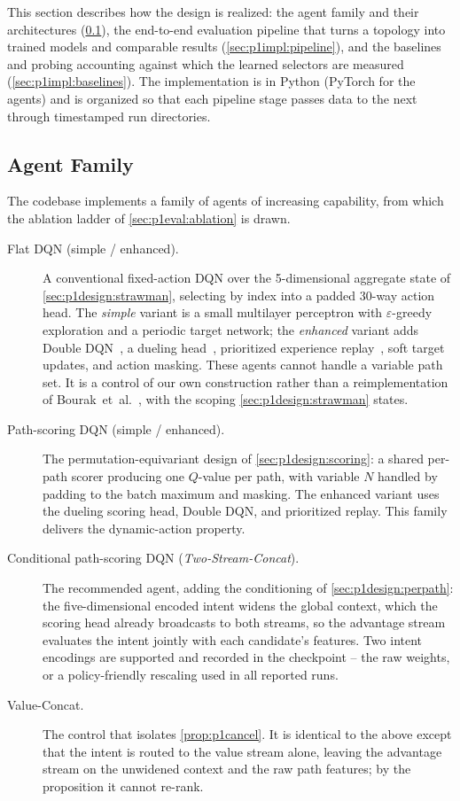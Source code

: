 This section describes how the design is realized: the agent family and their architectures
(\cref{sec:p1impl:agents}), the end-to-end evaluation pipeline that turns a topology into trained models
and comparable results (\cref{sec:p1impl:pipeline}), and the baselines and probing accounting against
which the learned selectors are measured (\cref{sec:p1impl:baselines}). The implementation is in Python
(PyTorch for the agents) and is organized so that each pipeline stage passes data to the next through
timestamped run directories.

\subsection{Agent Family}
\label{sec:p1impl:agents}

The codebase implements a family of agents of increasing capability, from which the ablation ladder of
\cref{sec:p1eval:ablation} is drawn.

\begin{description}
  \item[Flat DQN (simple / enhanced).] A conventional fixed-action DQN over the 5-dimensional aggregate
  state of \cref{sec:p1design:strawman}, selecting by index into a padded 30-way action head. The
  \emph{simple} variant is a small multilayer perceptron with $\varepsilon$-greedy
  exploration and a periodic target network; the \emph{enhanced} variant adds Double
  DQN~\cite{VanHasselt2016}, a dueling head~\cite{Wang2016}, prioritized experience
  replay~\cite{Schaul2016}, soft target updates, and action masking. These agents cannot handle a
  variable path set. It is a control of our own construction rather than a reimplementation of
  Bourak~et~al.~\cite{Bourak2025}, with the scoping \cref{sec:p1design:strawman} states.
  \item[Path-scoring DQN (simple / enhanced).] The permutation-equivariant design of
  \cref{sec:p1design:scoring}: a shared per-path scorer producing one $Q$-value per path, with variable
  $N$ handled by padding to the batch maximum and masking. The enhanced variant uses the dueling scoring
  head, Double DQN, and prioritized replay. This family delivers the dynamic-action property.
  \item[Conditional path-scoring DQN (\emph{Two-Stream-Concat}).] The recommended agent, adding the
  conditioning of \cref{sec:p1design:perpath}: the five-dimensional encoded intent widens the global
  context, which the scoring head already broadcasts to both streams, so the advantage stream evaluates
  the intent jointly with each candidate's features. Two intent encodings are supported and recorded in
  the checkpoint -- the raw weights, or a policy-friendly rescaling used in all reported runs.
  \item[Value-Concat.] The control that isolates \cref{prop:p1cancel}. It is identical to the above
  except that the intent is routed to the value stream alone, leaving the advantage stream on the
  unwidened context and the raw path features; by the proposition it cannot re-rank.
\end{description}

